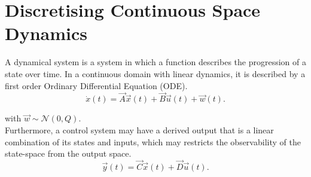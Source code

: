 \documentclass[runningheads,a4paper]{llncs}
\begin{document}
\section{Discretising Continuous Space Dynamics}

A dynamical system is a system in which a function describes the progression of a state over time. 
In a continuous domain with linear dynamics, it is described by a first order Ordinary Differential Equation (ODE).
\begin{equation}
\dot{x}(t)=\vec{A}\vec{x}(t)+\vec{B}\vec{u}(t) +\vec{w}(t).
\label{eq:dynamical}
\end{equation}

\noindent with $\vec{w} \sim \mathcal{N}(0,Q)$.\\
Furthermore, a control system may have a derived output that is a linear combination of its states and inputs, 
which may restricts the observability of the state-space from the output space.
\begin{equation}
\vec{y}(t)=\vec{C}\vec{x}(t)+\vec{D}\vec{u}(t).
\end{equation}
\end{document}
